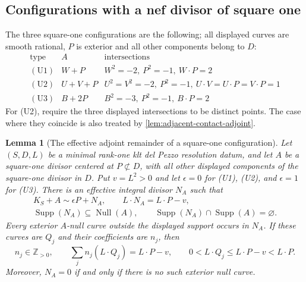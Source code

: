 \documentclass[11pt,reqno]{amsart}
\newtheorem{lemma}[lemma]{Lemma}
\theoremstyle{definition}
\theoremstyle{remark}
\DeclareMathOperator{\Null}{Null}
\newcommand{\ZZ}{\mathbb Z}
\numberwithin{equation}{section}
\begin{document}
\subsection{Configurations with a nef divisor of square one}
The three square-one configurations are the following; all displayed
curves are smooth rational, $P$ is exterior and all other components
belong to $D$:
\[
\begin{array}{c|c|c}
\text{type}&A&\text{intersections}\\\hline
\mathrm{(U1)}&W+P&W^2=-2,\ P^2=-1,\ W\cdot P=2\\
\mathrm{(U2)}&U+V+P&U^2=V^2=-2,\ P^2=-1,
\ U\cdot V=U\cdot P=V\cdot P=1\\
\mathrm{(U3)}&B+2P&B^2=-3,\ P^2=-1,\ B\cdot P=2
\end{array}
\]
For (U2), require the three displayed intersections to be distinct
points. The case where they coincide is also treated by
\cref{lem:adjacent-contact-adjoint}.


\begin{lemma}[The effective adjoint remainder of a square-one configuration]
\label{lem:square-one-adjoint}
Let $(S,D,L)$ be a minimal rank-one klt del Pezzo resolution datum,
and let $A$ be a square-one divisor centered at $P\not\subset D$, with all
other displayed components of the square-one divisor in $D$.  Put $v=L^2>0$ and let
$\epsilon=0$ for \textup{(U1)}, \textup{(U2)}, and $\epsilon=1$ for
\textup{(U3)}.  There is an effective integral divisor $N_A$ such that
\[
 \begin{gathered}
 K_S+A\sim\epsilon P+N_A,\qquad L\cdot N_A=L\cdot P-v,\\
 \operatorname{Supp}(N_A)\subseteq\Null(A),\qquad
 \operatorname{Supp}(N_A)\cap\operatorname{Supp}(A)=\varnothing.
 \end{gathered}
\]
Every exterior $A$-null curve outside the displayed support
occurs in $N_A$.  If these curves are $Q_j$ and their coefficients
are $n_j$, then
\begin{equation}\label{eq:square-one-exterior-degree}
 n_j\in\ZZ_{>0},\qquad
 \sum_j n_j(L\cdot Q_j)=L\cdot P-v,\qquad
 0<L\cdot Q_j\le L\cdot P-v<L\cdot P.
\end{equation}
Moreover, $N_A=0$ if and only if there is no such exterior null curve.
\end{lemma}
\end{document}
